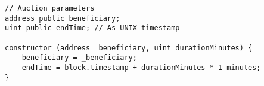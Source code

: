 \begin{lstlisting}[language=Solidity]
// Auction parameters
address public beneficiary;
uint public endTime; // As UNIX timestamp

constructor (address _beneficiary, uint durationMinutes) {
	beneficiary = _beneficiary;
	endTime = block.timestamp + durationMinutes * 1 minutes;
}
\end{lstlisting}